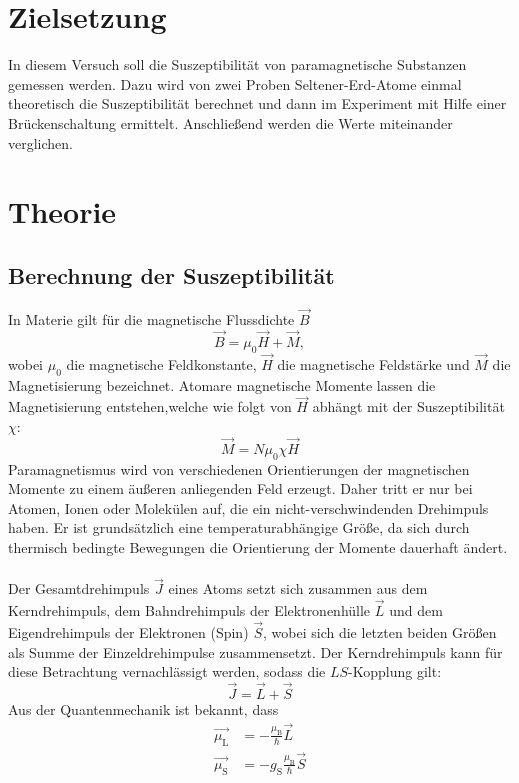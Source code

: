 \section{Zielsetzung}
\label{sec:Zielsetzung}
In diesem Versuch soll die Suszeptibilität von paramagnetische Substanzen gemessen werden. 
Dazu wird von zwei Proben Seltener-Erd-Atome einmal theoretisch die Suszeptibilität berechnet und dann im Experiment mit Hilfe einer Brückenschaltung ermittelt.
Anschließend werden die Werte miteinander verglichen.
\section{Theorie}
\label{sec:Theorie}
\subsection{Berechnung der Suszeptibilität}
In Materie gilt für die magnetische Flussdichte $\vec{B}$
\begin{equation*}
    \vec{B} = \mu_0\vec{H} + \vec{M},
\end{equation*}
wobei $\mu_0$ die magnetische Feldkonstante, $\vec{H}$ die magnetische Feldstärke und $\vec{M}$ die Magnetisierung bezeichnet.
Atomare magnetische Momente lassen die Magnetisierung entstehen,welche wie folgt von $\vec{H}$ abhängt mit der Suszeptibilität $\chi$:
\begin{equation}\label{eqn:magnetisierung}
    \vec{M} = N \mu_0 \chi \vec{H} 
\end{equation}
Paramagnetismus wird von verschiedenen Orientierungen der magnetischen Momente zu einem äußeren anliegenden Feld erzeugt. 
Daher tritt er nur bei Atomen, Ionen oder Molekülen auf, die ein nicht-verschwindenden Drehimpuls haben.
Er ist grundsätzlich eine temperaturabhängige Größe, da sich durch thermisch bedingte Bewegungen die Orientierung der Momente dauerhaft ändert.\\
\\
Der Gesamtdrehimpuls $\vec{J}$ eines Atoms setzt sich zusammen aus dem Kerndrehimpuls, dem Bahndrehimpuls der Elektronenhülle $\vec{L}$ und dem Eigendrehimpuls der Elektronen (Spin) $\vec{S}$, wobei sich die letzten beiden Größen als Summe der Einzeldrehimpulse zusammensetzt.
Der Kerndrehimpuls kann für diese Betrachtung vernachlässigt werden, sodass die $LS$-Kopplung gilt: 
\begin{equation}
    \vec{J} = \vec{L} + \vec{S}
\end{equation}
Aus der Quantenmechanik ist bekannt, dass 
\begin{align}
    \vec{\mu_{\text{L}}} &= - \frac{\mu_{\text{B}}}{\hbar} \vec{L}\\
    \vec{\mu_{\text{S}}} &= - g_{\text{S}} \frac{\mu_{\text{B}}}{\hbar} \vec{S}
\end{align}
